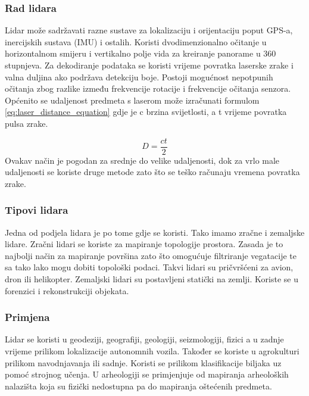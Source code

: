 \subsubsection{Rad lidara}
Lidar može sadržavati razne sustave za lokalizaciju i orijentaciju poput GPS-a, inercijskih sustava (IMU) i ostalih. Koristi dvodimenzionalno očitanje u horizontalnom smijeru i vertikalno polje vida za kreiranje panorame u 360 stupnjeva. Za dekodiranje podataka se koristi vrijeme povratka laserske zrake  i valna duljina ako podržava detekciju boje. Postoji mogućnost nepotpunih očitanja zbog razlike između frekvencije rotacije i frekvencije očitanja senzora. Općenito se udaljenost predmeta s laserom može izračunati formulom \ref{eq:laser_distance_equation} gdje je c brzina svijetlosti, a t vrijeme povratka pulsa zrake.

\begin{equation}
  D=\frac{ct}{2}\label{eq:laser_distance_equation}
\end{equation}
Ovakav način je pogodan za srednje do velike udaljenosti, dok za vrlo male udaljenosti se koriste druge metode zato što se teško računaju vremena povratka zrake.

\subsubsection{Tipovi lidara}

Jedna od podjela lidara je po tome gdje se koristi. Tako imamo zračne i zemaljske lidare. Zračni lidari se koriste za mapiranje topologije prostora. Zasada je to najbolji način za mapiranje površina zato što omogućuje filtriranje vegatacije te sa tako lako mogu dobiti topološki podaci. Takvi lidari su pričvršćeni za avion, dron ili helikopter. Zemaljski lidari su postavljeni statički na zemlji. Koriste se u forenzici i rekonstrukciji objekata. 

\subsubsection{Primjena}

Lidar se koristi u geodeziji, geografiji, geologiji, seizmologiji, fizici a u zadnje vrijeme prilikom lokalizacije autonomnih vozila. Također se koriste u agrokulturi prilikom navodnjavanja ili sadnje. Koristi se prilikom klasifikacije biljaka uz pomoć strojnog učenja. U arheologiji se primjenjuje od mapiranja arheoloških nalazišta koja su fizički nedostupna pa do mapiranja oštećenih predmeta.

